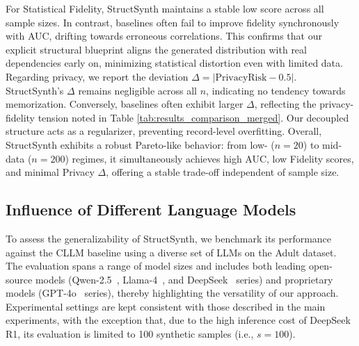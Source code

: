 For Statistical Fidelity, \textsf{StructSynth} maintains a stable low score across all sample sizes. In contrast, baselines often fail to improve fidelity synchronously with AUC, drifting towards erroneous correlations. This confirms that our explicit structural blueprint aligns the generated distribution with real dependencies early on, minimizing statistical distortion even with limited data. Regarding privacy, we report the deviation $\Delta = |\text{PrivacyRisk} - 0.5|$. \textsf{StructSynth}'s $\Delta$ remains negligible across all $n$, indicating no tendency towards memorization. Conversely, baselines often exhibit larger $\Delta$, reflecting the privacy-fidelity tension noted in Table \ref{tab:results_comparison_merged}. Our decoupled structure acts as a regularizer, preventing record-level overfitting. Overall, \textsf{StructSynth} exhibits a robust Pareto-like behavior: from low- ($n=20$) to mid-data ($n=200$) regimes, it simultaneously achieves high AUC, low Fidelity scores, and minimal Privacy $\Delta$, offering a stable trade-off independent of sample size.






\subsection{Influence of Different Language Models}

To assess the generalizability of \textsf{StructSynth}, we benchmark its performance against the CLLM baseline using a diverse set of LLMs on the Adult dataset. The evaluation spans a range of model sizes and includes both leading open-source models (Qwen-2.5~\cite{team2024qwen2}, Llama-4~\cite{meta2025llama4}, and DeepSeek~\cite{liu2024deepseek, guo2025deepseek} series) and proprietary models (GPT-4o~\cite{hurst2024gpt} series), thereby highlighting the versatility of our approach. Experimental settings are kept consistent with those described in the main experiments, with the exception that, due to the high inference cost of DeepSeek R1, its evaluation is limited to 100 synthetic samples (i.e., $s=100$).

